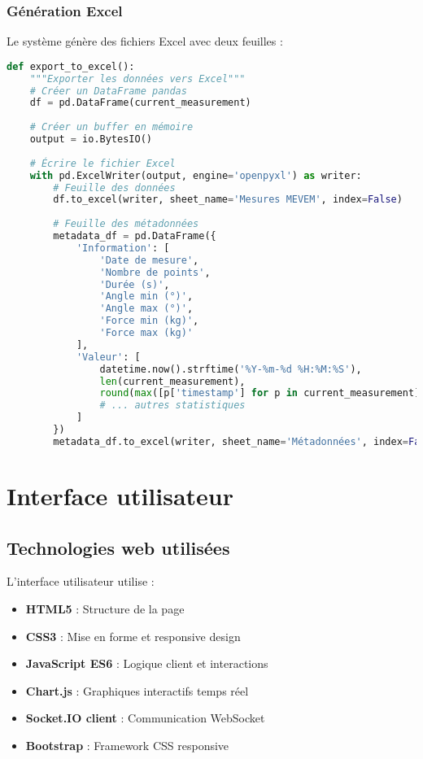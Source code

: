\documentclass[12pt,a4paper]{article}
\begin{document}
\subsubsection{Génération Excel}

Le système génère des fichiers Excel avec deux feuilles :

\begin{lstlisting}[language=python, caption=Génération du fichier Excel]
def export_to_excel():
    """Exporter les données vers Excel"""
    # Créer un DataFrame pandas
    df = pd.DataFrame(current_measurement)
    
    # Créer un buffer en mémoire
    output = io.BytesIO()
    
    # Écrire le fichier Excel
    with pd.ExcelWriter(output, engine='openpyxl') as writer:
        # Feuille des données
        df.to_excel(writer, sheet_name='Mesures MEVEM', index=False)
        
        # Feuille des métadonnées
        metadata_df = pd.DataFrame({
            'Information': [
                'Date de mesure', 
                'Nombre de points', 
                'Durée (s)', 
                'Angle min (°)', 
                'Angle max (°)', 
                'Force min (kg)', 
                'Force max (kg)'
            ],
            'Valeur': [
                datetime.now().strftime('%Y-%m-%d %H:%M:%S'),
                len(current_measurement),
                round(max([p['timestamp'] for p in current_measurement]), 2),
                # ... autres statistiques
            ]
        })
        metadata_df.to_excel(writer, sheet_name='Métadonnées', index=False)
\end{lstlisting}

\section{Interface utilisateur}

\subsection{Technologies web utilisées}

L'interface utilisateur utilise :
\begin{itemize}
    \item \textbf{HTML5} : Structure de la page
    \item \textbf{CSS3} : Mise en forme et responsive design
    \item \textbf{JavaScript ES6} : Logique client et interactions
    \item \textbf{Chart.js} : Graphiques interactifs temps réel
    \item \textbf{Socket.IO client} : Communication WebSocket
    \item \textbf{Bootstrap} : Framework CSS responsive
\end{itemize}
\end{document}
